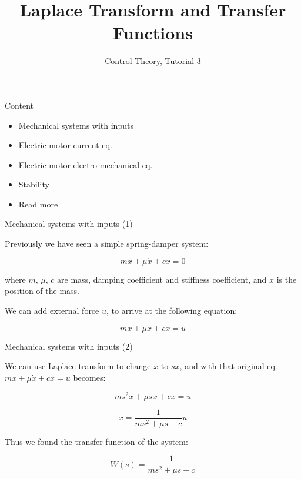 \documentclass{beamer}
\title{Laplace Transform and Transfer Functions}
\subtitle{Control Theory, Tutorial 3}
\date{\mydate}
\begin{document}
\maketitle


\begin{frame}{Content}

\begin{itemize}
\item Mechanical systems with inputs
\item Electric motor current eq.
\item Electric motor electro-mechanical eq.
\item Stability
\item Read more
\end{itemize}

\end{frame}




\begin{frame}{Mechanical systems with inputs (1)}
\begin{flushleft}

Previously we have seen a simple spring-damper system:

\begin{equation}
    m \ddot x + \mu \dot x + c x = 0
\end{equation}

where $m$, $\mu$, $c$ are mass, damping coefficient and stiffness coefficient, and $x$ is the position of the mass.

\bigskip

We can add external force $u$, to arrive at the following equation:

\begin{equation}
    m \ddot x + \mu \dot x + c x = u
\end{equation}

\end{flushleft}
\end{frame}


\begin{frame}{Mechanical systems with inputs (2)}
\begin{flushleft}

We can use Laplace transform to change $\dot x$ to $s x$, and with that original eq. $m \ddot x + \mu \dot x + c x = u$ becomes:

\begin{equation}
    m s^2 x + \mu s x + c x = u
\end{equation}

\begin{equation}
    x = \frac{1}{m s^2 + \mu s + c } u
\end{equation}

Thus we found the transfer function of the system:

\begin{equation}
    W(s) = \frac{1}{m s^2 + \mu s + c }
\end{equation}

\end{flushleft}
\end{frame}
\end{document}
